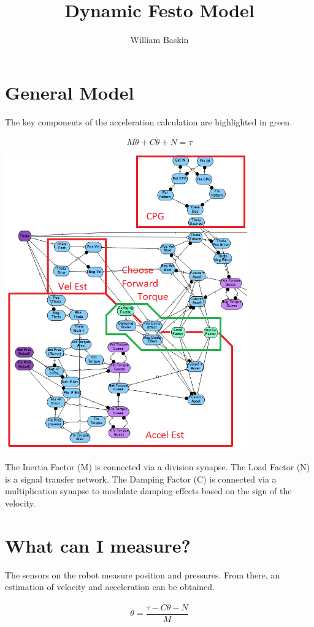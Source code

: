 \documentclass[12pt, letterpaper, oneside, notitlepage, onecolumn]{article}
\author{William Baskin}
\title{Dynamic Festo Model}
\newcommand{\bbs}[1]{\section{#1}}
\begin{document}
\maketitle

\bbs{General Model}

The key components of the acceleration calculation are highlighted in green.

\begin{equation}
M \ddot{\theta} + C \dot{\theta} + N = \tau
\end{equation}

\begin{center}
\includegraphics[height=5in, angle=0]{NetworkLayout}
\end{center}

The Inertia Factor (M) is connected via a division synapse. The Load Factor (N) is a signal transfer network. The Damping Factor (C) is connected via a multiplication synapse to modulate damping effects based on the sign of the velocity.

\bbs{What can I measure?}

The sensors on the robot measure position and pressures. From there, an estimation of velocity and acceleration can be obtained.

\begin{equation}
\ddot{\theta} = \dfrac{\tau - C \dot{\theta} - N}{M}
\end{equation}
\end{document}
